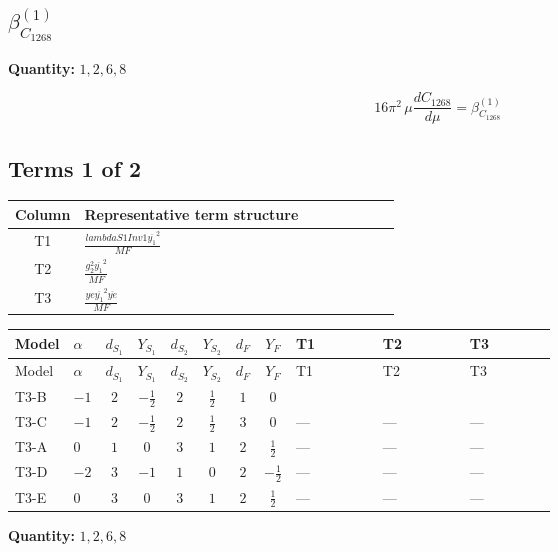\documentclass[8pt]{article}
\begin{document}
\begin{landscape}
\section*{$\beta_{C_{1268}}^{(1)}$}
\noindent\textbf{Quantity: }$\mathrm{1,2,6,8}$\par\smallskip
\[16\pi^2\,\mu\frac{d C_{1268}}{d\mu}=\beta_{C_{1268}}^{(1)}\]
\subsection*{Terms 1 of 2}
\begin{center}
\begin{tabular}{@{}c >{\raggedright\arraybackslash}p{0.82\linewidth}@{}}
\toprule
Column & Representative term structure \\
\midrule
T1 & \(\displaystyle \frac{lambdaS1Inv1 \overline{y_{1}}^{2}}{MF}\) \\
\midrule
T2 & \(\displaystyle \frac{g_{2}^{2} \overline{y_{1}}^{2}}{MF}\) \\
\midrule
T3 & \(\displaystyle \frac{ye \overline{y_{1}}^{2} \overline{ye}}{MF}\) \\
\midrule
\bottomrule
\end{tabular}
\end{center}
\smallskip
\tiny
\begin{longtable}{@{}llcccccc >{\raggedright\arraybackslash}p{0.21\linewidth} >{\raggedright\arraybackslash}p{0.21\linewidth} >{\raggedright\arraybackslash}p{0.21\linewidth}@{}}
\toprule
Model & $\alpha$ & $d_{S_1}$ & $Y_{S_1}$ & $d_{S_2}$ & $Y_{S_2}$ & $d_F$ & $Y_F$ & T1 & T2 & T3 \\
\midrule
\endfirsthead
\toprule
Model & $\alpha$ & $d_{S_1}$ & $Y_{S_1}$ & $d_{S_2}$ & $Y_{S_2}$ & $d_F$ & $Y_F$ & T1 & T2 & T3 \\
\midrule
\endhead
T3-B & $-1$ & $2$ & $-\frac{1}{2}$ & $2$ & $\frac{1}{2}$ & $1$ & $0$ & \scriptsize\adjustbox{max width=\linewidth}{$\begin{gathered} \frac{lambdaS1Inv1 \overline{y_{1}}^{2}}{4 MF}\end{gathered}$} & \scriptsize\adjustbox{max width=\linewidth}{$\begin{gathered} \frac{3 g_{2}^{2} \overline{y_{1}}^{2}}{8 MF}\end{gathered}$} & \scriptsize\adjustbox{max width=\linewidth}{$\begin{gathered} - \frac{ye \overline{y_{1}}^{2} \overline{ye}}{8 MF}\end{gathered}$} \\
\midrule
T3-C & $-1$ & $2$ & $-\frac{1}{2}$ & $2$ & $\frac{1}{2}$ & $3$ & $0$ & --- & --- & --- \\
\midrule
T3-A & $0$ & $1$ & $0$ & $3$ & $1$ & $2$ & $\frac{1}{2}$ & --- & --- & --- \\
\midrule
T3-D & $-2$ & $3$ & $-1$ & $1$ & $0$ & $2$ & $-\frac{1}{2}$ & --- & --- & --- \\
\midrule
T3-E & $0$ & $3$ & $0$ & $3$ & $1$ & $2$ & $\frac{1}{2}$ & --- & --- & --- \\
\midrule
\bottomrule
\end{longtable}
\clearpage
\noindent\textbf{Quantity: }$\mathrm{1,2,6,8}$\par\smallskip

\end{landscape}
\end{document}
